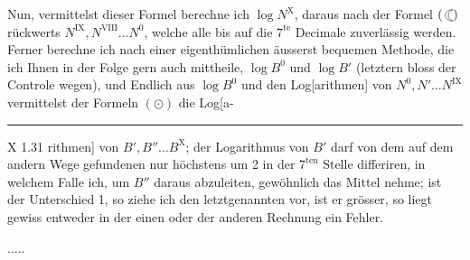 \par\indent Nun, vermittelst dieser Formel berechne ich $\log N^{\mathrm X}$, daraus nach der Formel $(\BesselMoon)$ rückwerts $N^{\mathrm{IX}},N^{\mathrm{VIII}}\ldots N^0$, welche alle bis auf die $7^{\mathrm{te}}$ Decimale zuverlässig werden. Ferner berechne ich nach einer eigenthümlichen äusserst bequemen Methode, die ich Ihnen in der Folge gern auch mittheile, $\log B^0$ und $\log B'$ (letztern bloss der Controle wegen), und Endlich aus $\log B^0$ und den Log[arithmen] von $N^0,N'\ldots N^{\mathrm{IX}}$ vermittelst der Formeln $(\odot)$ die Log[a-
\par\vfill\noindent\rule{.25\linewidth}{.4pt}\par\smallskip
\begingroup\footnotesize{}\par\endgroup
\smallskip\noindent\small X 1.\hfill31\normalsize
\clearpage
{}
\noindent rithmen] von $B',B''\ldots B^{\mathrm X}$; der Logarithmus von $B'$ darf von dem auf dem andern Wege gefundenen nur höchstens um 2 in der $7^{\mathrm{ten}}$ Stelle differiren, in welchem Falle ich, um $B''$ daraus abzuleiten, gewöhnlich das Mittel nehme; ist der Unterschied 1, so ziehe ich den letztgenannten vor, ist er grösser, so liegt gewiss entweder in der einen oder der anderen Rechnung ein Fehler.
\par\noindent .\quad .\quad .\quad .\quad .
\clearpage
\endgroup
